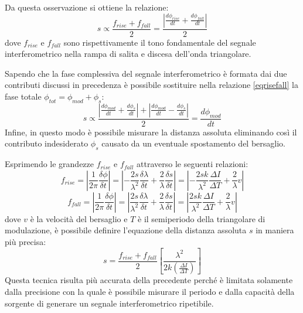 \begin{enumerate}
Da questa osservazione si ottiene la relazione:
\begin{equation}
	s \propto \frac{f_{rise}+f_{fall}}{2} = \frac{ \left | \frac{d\phi_{rise}}{dt} + \frac{d\phi_{fall}}{dt} \right |}{2}
	\label{eqrisefall}
\end{equation}
dove $f_{rise}$ e $f_{fall}$ sono rispettivamente il tono fondamentale del segnale interferometrico nella rampa di salita e discesa dell'onda triangolare.

Sapendo che la fase complessiva del segnale interferometrico è formata dai due contributi discussi in precedenza è possibile sostituire nella relazione \ref{eqrisefall} la fase totale $\phi_{tot} = \phi_{mod} + \phi_s$:
\begin{equation}
	s \propto \frac{ \left | \frac{d\phi_{mod}}{dt} + \frac{d\phi_{s}}{dt} \right |+ \left | \frac{d\phi_{mod}}{dt} - \frac{d\phi_{s}}{dt} \right |}{2} = \frac{d\phi_{mod}}{dt}
\end{equation}
Infine, in questo modo è possibile misurare la distanza assoluta eliminando così il contributo indesiderato $\phi_s$ causato da un eventuale spostamento del bersaglio.

Esprimendo le grandezze $f_{rise}$ e $f_{fall}$ attraverso le seguenti relazioni:
\begin{equation}
	f_{rise}= \left | \frac{1}{2\pi} \frac{\delta \phi}{\delta t} \right | = \left | - \frac{2s}{\lambda^2} \frac{\delta \lambda}{\delta t} + \frac{2}{\lambda} \frac{\delta s}{\delta t} \right | = \left | - \frac{2sk}{\lambda^2} \frac{\Delta I}{\Delta T} + \frac{2}{\lambda}v \right |
\end{equation}
\begin{equation}
	f_{fall}= \left | \frac{1}{2\pi} \frac{\delta \phi}{\delta t} \right | = \left | \frac{2s}{\lambda^2} \frac{\delta \lambda}{\delta t} + \frac{2}{\lambda} \frac{\delta s}{\delta t} \right | = \left | \frac{2sk}{\lambda^2} \frac{\Delta I}{\Delta T} + \frac{2}{\lambda}v \right |
\end{equation}
dove $v$ è la velocità del bersaglio e $T$ è il semiperiodo della triangolare di modulazione, è possibile definire l'equazione della distanza assoluta $s$ in maniera più precisa:
\begin{equation}
	s = \frac{f_{rise}+f_{fall}}{2} \left [ \frac{\lambda^2}{2k\left ( \frac{\Delta I}{\Delta T} \right )}  \right ]
\end{equation}
Questa tecnica risulta più accurata della precedente perché è limitata solamente dalla precisione con la quale è possibile misurare il periodo e dalla capacità della sorgente di generare un segnale interferometrico ripetibile. 

\end{enumerate}

